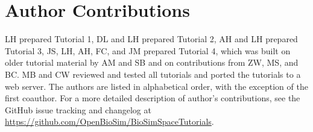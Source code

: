 \documentclass[9pt,tutorial]{livecoms}
\newcommand{\githubrepository}{\url{https://github.com/OpenBioSim/BioSimSpaceTutorials}}  %
\begin{document}
%
%

%

\section{Author Contributions}
%
LH prepared Tutorial 1, DL and LH prepared Tutorial 2, AH and LH prepared Tutorial 3, JS, LH, AH, FC, and JM prepared Tutorial 4, which was built on older tutorial material by AM and SB and on contributions from ZW, MS, and BC. MB and CW reviewed and tested all tutorials and ported the tutorials to a web server. The authors are listed in alphabetical order, with the exception of the first coauthor.
For a more detailed description of author's contributions,
see the GitHub issue tracking and changelog at \githubrepository.
\end{document}
